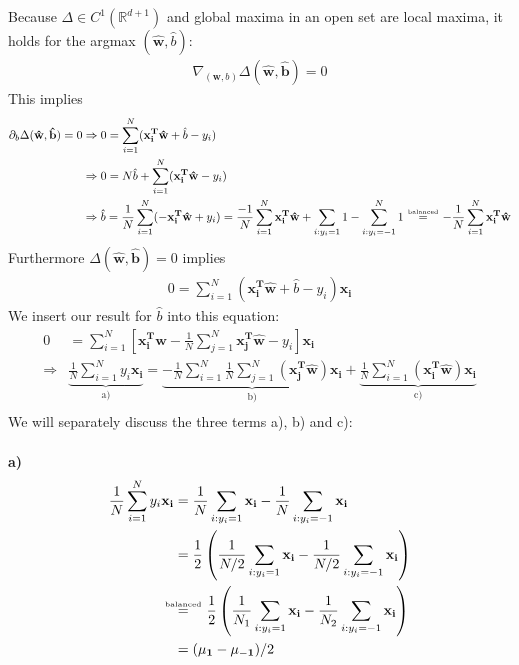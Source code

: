 \documentclass[11pt]{article}
\newcommand\balancedeq{\stackrel{\mathclap{\tiny\mbox{balanced}}}{=}}
\begin{document}
Because $\Delta \in C^1(\mathbb{R}^{d+1})$ and global maxima in an open set are local maxima, it holds for the argmax $(\mathbf{\hat{w}}, \hat{b})$:
\begin{align*}
\nabla_{(\mathbf{w}, b)} \Delta(\mathbf{\hat{w}, \hat{b}}) = 0
\end{align*}
This implies
\begin{align*}
\partial_b \Delta(\mathbf{\hat{w}, \hat{b}}) = 0 & \Rightarrow 0 = \sum_{i=1}^N(\mathbf{x_i^T \hat{w}} + \hat{b} - y_i)\\
& \Rightarrow 0 = N\hat{b} + \sum_{i=1}^N(\mathbf{x_i^T \hat{w}} - y_i) \\
& \Rightarrow \hat{b} = \frac{1}{N} \sum_{i=1}^N(-\mathbf{x_i^T \hat{w}} + y_i) = \frac{-1}{N} \sum_{i=1}^N \mathbf{x_i^T \hat{w}} + \sum_{i: y_i=1} 1 - \sum_{i: y_i=-1}^N 1 \quad \balancedeq \quad -\frac{1}{N} \sum_{i=1}^N \mathbf{x_i^T \hat{w}}
\end{align*}
Furthermore $\Delta(\mathbf{\hat{w}, \hat{b}}) = 0$ implies
\begin{align*}
0 = \sum_{i=1}^N(\mathbf{x_i^T\hat{w}}+\hat{b}-y_i)\mathbf{x_i}
\end{align*}
We insert our result for $\hat{b}$ into this equation:
\begin{align*}
0 & = \sum_{i=1}^N \left[ \mathbf{x_i^T \hat{w}} - \frac{1}{N} \sum_{j=1}^N \mathbf{x_j^T \hat{w}} - y_i  \right] \mathbf{x_i}\\
\Rightarrow & \underbrace{\frac{1}{N} \sum_{i=1}^N y_i \mathbf{x_i}}_\text{a)} = \underbrace{-\frac{1}{N} \sum_{i=1}^N \frac{1}{N} \sum_{j=1}^N (\mathbf{x_j^T\hat{w}}) \mathbf{x_i}}_\text{b)} + \underbrace{\frac{1}{N} \sum_{i=1}^N (\mathbf{x_i^T \hat{w}})\mathbf{x_i}}_\text{c)}\\
\end{align*}
We will separately discuss the three terms a), b) and c):\\
\ \\
\textbf{a)}
\begin{align*}
\frac{1}{N} \sum_{i=1}^N y_i \mathbf{x_i} & = \frac{1}{N} \sum_{i:y_i=1}\mathbf{x_i} - \frac{1}{N} \sum_{i:y_i=-1}\mathbf{x_i}\\
& = \frac{1}{2} \left( \frac{1}{N/2} \sum_{i:y_i=1} \mathbf{x_i} - \frac{1}{N/2} \sum_{i:y_i=-1} \mathbf{x_i} \right)\\
& \balancedeq \quad \frac{1}{2} \left( \frac{1}{N_1} \sum_{i:y_i=1} \mathbf{x_i} - \frac{1}{N_2} \sum_{i:y_i=-1} \mathbf{x_i} \right)\\
& = (\mathbf{\mu_1} - \mathbf{\mu_ {-1}})/2\\
\end{align*}
\end{document}
